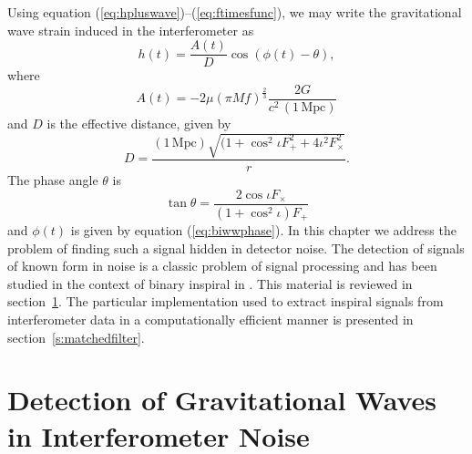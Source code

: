 
Using equation (\ref{eq:hpluswave})--(\ref{eq:ftimesfunc}), we may write the
gravitational wave strain induced in the interferometer as
\begin{equation}
h(t) = \frac{A(t)}{D} \cos\left( \phi(t) - \theta \right),
\label{eq:rootwaveform}
\end{equation}
where
\begin{equation}
A(t) = -2 \mu (\pi M f)^\frac{2}{3} \frac{2G}{c^2\,(1\,\mathrm{Mpc})}
\end{equation}
and $D$ is the effective distance, given by
\begin{equation}
D = \frac{(1\,\mathrm{Mpc}) \sqrt{ (1 + \cos^2 \iota F_+^2 + 4\iota^2
F_\times^2}}{r}.
\end{equation}
The phase angle $\theta$ is
\begin{equation}
\tan \theta = \frac{2\cos \iota F_\times}{(1 + \cos^2 \iota) F_+}
\end{equation}
and $\phi(t)$ is given by equation (\ref{eq:biwwphase}).
In this chapter we address the problem of finding such a signal hidden in
detector noise. The detection of signals of known form in noise is a classic
problem of signal processing\cite{wainstein:1962} and has been studied in the
context of binary inspiral in \cite{Finn:1992wt,Finn:1992xs}. This material is
reviewed in section~\ref{s:detectiontheory}. The particular implementation
used to extract inspiral signals from interferometer data in a computationally
efficient manner is presented in section~\ref{s:matchedfilter}.

\section{Detection of Gravitational Waves in Interferometer Noise}
\label{s:detectiontheory}

